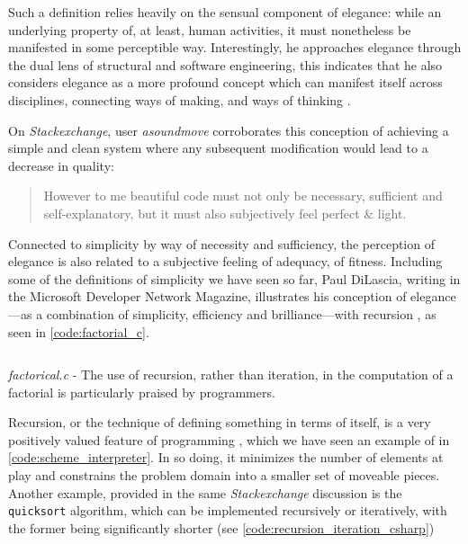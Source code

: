 Such a definition relies heavily on the sensual component of elegance: while an underlying property of, at least, human activities, it must nonetheless be manifested in some perceptible way. Interestingly, he approaches elegance through the dual lens of structural and software engineering, this indicates that he also considers elegance as a more profound concept which can manifest itself across disciplines, connecting ways of making, and ways of thinking \citep{mclennan_who_1997}. 

On \emph{Stackexchange}, user \emph{asoundmove} corroborates this conception of achieving a simple and clean system where any subsequent modification would lead to a decrease in quality:

\begin{quote}
  However to me beautiful code must not only be necessary, sufficient and self-explanatory, but it must also subjectively feel perfect \& light. \citep{stackoverflow_how_2013}
\end{quote}

Connected to simplicity by way of necessity and sufficiency, the perception of elegance is also related to a subjective feeling of adequacy, of fitness. Including some of the definitions of simplicity we have seen so far, Paul DiLascia, writing in the Microsoft Developer Network Magazine, illustrates his conception of elegance—as a combination of simplicity, efficiency and brilliance—with recursion \citep{dilascia_end_2019}, as seen in \autoref{code:factorial_c}.

\begin{listing}
  \inputminted{c}{./corpus/factorial.c}
  \caption{\emph{factorical.c} - The use of recursion, rather than iteration, in the computation of a factorial is particularly praised by programmers.}
  \label{code:factorial_c}
\end{listing}

Recursion, or the technique of defining something in terms of itself, is a very positively valued feature of programming \citep{abelson_structure_1979}, which we have seen an example of in \autoref{code:scheme_interpreter}. In so doing, it minimizes the number of elements at play and constrains the problem domain into a smaller set of moveable pieces. Another example, provided in the same \emph{Stackexchange} discussion is the \lstinline{quicksort} algorithm, which can be implemented recursively or iteratively, with the former being significantly shorter (see \autoref{code:recursion_iteration_csharp})

